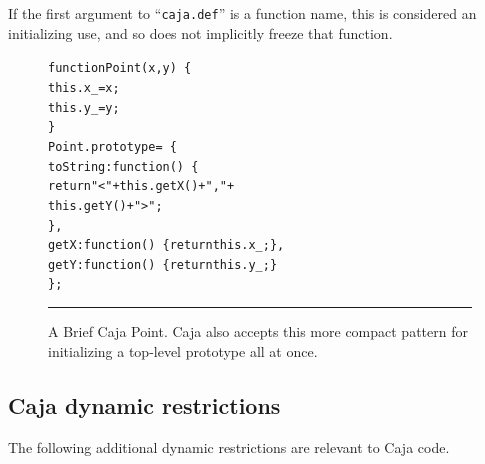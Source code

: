 \documentclass[letterpaper,twocolumn,10pt]{article}
\newcommand{\code}[1]{{\tt {#1}}}              %
\begin{document}
If the first argument to ``\code{caja.def}'' is a function name, this is 
considered an initializing use, and so does not implicitly freeze that 
function. 



\begin{figure}[t!]
\begin{alltt}
function Point(x, y)\ \{
  this.x\_ = x;
  this.y\_ = y;
\}
Point.prototype =\ \{
  toString: function()\ \{ 
    return "<" + this.getX() + "," + 
                 this.getY() + ">"; 
  \},
  getX: function()\ \{ return this.x\_; \},
  getY: function()\ \{ return this.y\_; \}
\};
\end{alltt}

\caption[A Brief Caja Point.]{A Brief Caja Point. Caja also accepts this more 
compact pattern for initializing a top-level prototype all at once. \\ } 
\hrule
\label{fig:brief-caja-point}
\end{figure}


\subsection{Caja dynamic restrictions}
\label{subsec:caja-dynamic}

The following additional dynamic restrictions are relevant to Caja code.
\end{document}
